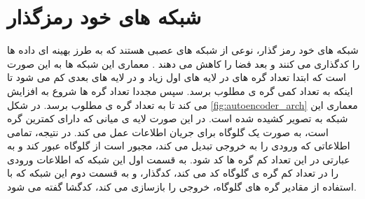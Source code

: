 \section{شبکه های خود رمزگذار}

شبکه های خود رمز گذار، نوعی از شبکه های عصبی هستند که به طرز بهینه ای داده ها را کدگذاری می کنند و بعد فضا را کاهش می دهند
\cite{TODO}.
معماری این شبکه ها به این صورت است که ابتدا تعداد گره های در لایه های اول زیاد و در لایه های بعدی کم می شود تا اینکه به تعداد کمی گره ی مطلوب برسد. سپس مجددا تعداد گره ها شروع به افزایش می کند تا به تعداد گره ی مطلوب برسد. در شکل
\ref{fig:autoencoder_arch}
معماری این شبکه به تصویر کشیده شده است.
در این صورت لایه ی میانی که دارای کمترین گره است، به صورت یک گلوگاه برای جریان اطلاعات عمل می کند. در نتیجه،‌ تمامی اطلاعاتی که ورودی را به خروجی تبدیل می کند،‌ مجبور است از گلوگاه عبور کند و به عبارتی در این تعداد کم گره ها کد شود. به قسمت اول این شبکه که اطلاعات ورودی را در تعداد کم گره ی گلوگاه کد می کند، کدگذار، و به قسمت دوم این شبکه که با استفاده از مقادیر گره های گلوگاه، خروجی را بازسازی می کند،‌ کدگشا گفته می شود.
